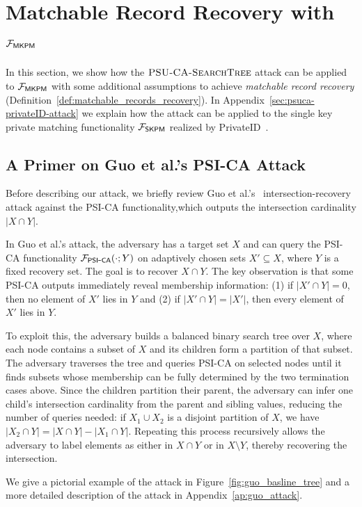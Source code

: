 \section{Matchable Record Recovery with $\mathcal{F}_{\mathsf{MKPM}}$}\label{sec:PSUCA_to_matching}
In this section, we show how the $\textsc{PSU\mbox{-}CA\mbox{-}SearchTree}{}$ attack can be applied to $\mathcal{F}_{\mathsf{MKPM}}$ with some additional assumptions to achieve \emph{matchable record recovery}
(Definition~\ref{def:matchable_records_recovery}). In
Appendix~\ref{sec:psuca-privateID-attack} we explain how the attack can
be applied to the single key private matching functionality $\mathcal{F}_{\mathsf{SKPM}}$ realized by PrivateID~\cite{PMC}.

\subsection{A Primer on Guo et al.'s PSI-CA Attack}
Before describing our attack, we briefly review Guo et al.’s~\cite{USENIX:GHLWJL22} intersection-recovery attack against the PSI-CA functionality,which outputs the intersection cardinality \(|X \cap Y|\). 

In Guo et al.’s attack, the adversary has a target set $X$ and can query the PSI-CA functionality $\mathcal{F}_{\mathsf{PSI\mbox{-}CA}}(\cdot ;Y)$ on adaptively chosen sets $X' \subseteq X$, where $Y$ is a fixed recovery set. The goal is to recover $X \cap Y$. The key observation is that some PSI-CA outputs immediately reveal membership information: (1) if $|X' \cap Y| = 0$, then no element of $X'$ lies in $Y$ and (2) if $|X' \cap Y| = |X'|$, then every element of $X'$ lies in $Y$.

To exploit this, the adversary builds a balanced binary search tree over $X$, where each node contains a subset of $X$ and its children form a partition of that subset. The adversary traverses the tree and queries PSI-CA on selected nodes until it finds subsets whose membership can be fully determined by the two termination cases above. Since the children partition their parent, the adversary can infer one child’s intersection cardinality from the parent and sibling values, reducing the number of queries needed: if $X_1 \cup X_2$ is a disjoint partition of $X$, we have $|X_2 \cap Y| = |X \cap Y| - |X_1\cap Y|$. Repeating this process recursively allows the adversary to label elements as either in $X\cap Y$ or in $X \setminus Y$, thereby recovering the intersection.

We give a pictorial example of the attack in Figure~\ref{fig:guo_basline_tree} and a more detailed description of the attack in Appendix~\ref{ap:guo_attack}.

